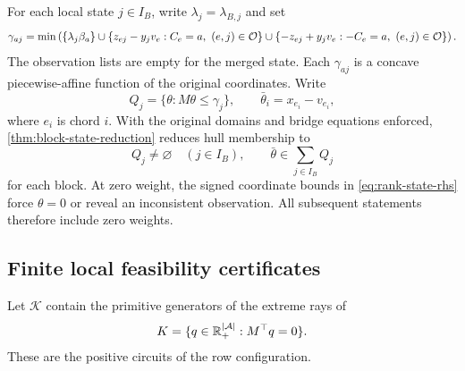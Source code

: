 For each local state $j\in I_B$, write $\lambda_j=\lambda_{B,j}$ and set
\begin{equation}\label{eq:rank-state-rhs}
 \gamma_{a j}=\min\left(
 \{\lambda_j\beta_a\}\cup
 \{z_{ej}-y_jv_e:C_e=a,\ (e,j)\in\mathcal O\}\cup
 \{-z_{ej}+y_jv_e:-C_e=a,\ (e,j)\in\mathcal O\}\right).
\end{equation}
The observation lists are empty for the merged state. Each $\gamma_{aj}$
is a concave piecewise-affine function of the original coordinates. Write
\begin{equation}\label{eq:rank-state-domains}
 Q_j=\{\theta:M\theta\le\gamma_j\},\qquad
 \bar\theta_i=x_{e_i}-v_{e_i},
\end{equation}
where $e_i$ is chord $i$. With the original domains and bridge equations
enforced, \cref{thm:block-state-reduction} reduces hull membership to
\begin{equation}\label{eq:rank-local-and-sum}
 Q_j\ne\varnothing\quad(j\in I_B),\qquad
                  \bar\theta\in\sum_{j\in I_B}Q_j
\end{equation}
for each block. At zero weight, the signed coordinate bounds in
\eqref{eq:rank-state-rhs} force $\theta=0$ or reveal an inconsistent
observation. All subsequent statements therefore include zero weights.

\subsection{Finite local feasibility certificates}\label{subsec:rank-circuits}
Let $\mathcal K$ contain the primitive generators of the extreme rays of
\begin{equation}\label{eq:rank-feasibility-cone}
 K=\{q\in\mathbb R_+^{|\mathcal A|}:M^\top q=0\}.
\end{equation}
These are the positive circuits of the row configuration.

